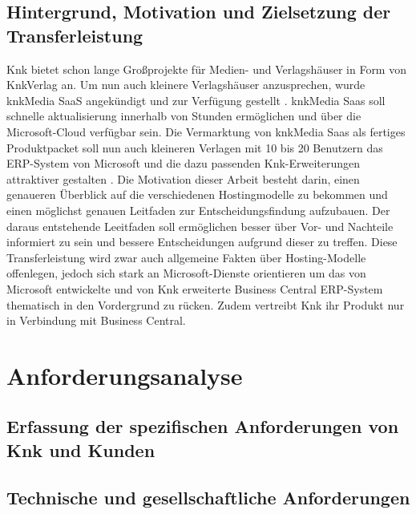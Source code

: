 \documentclass[12pt,bibtotoc]{article}
\begin{document}
	\subsection{Hintergrund, Motivation und Zielsetzung der Transferleistung}
	Knk bietet schon lange Großprojekte für Medien- und Verlagshäuser in Form von KnkVerlag an. 
	Um nun auch kleinere Verlagshäuser anzusprechen, wurde knkMedia SaaS angekündigt und zur Verfügung gestellt \cite{knk-kuendigtSaaS-an.2023}.
	\newline
	knkMedia Saas soll schnelle aktualisierung innerhalb von Stunden ermöglichen und über die Microsoft-Cloud verfügbar sein.
	Die Vermarktung von knkMedia Saas als fertiges Produktpacket soll nun auch kleineren Verlagen mit 10 bis 20 Benutzern das ERP-System von Microsoft und die dazu passenden Knk-Erweiterungen attraktiver gestalten \cite{knk-kuendigtSaaS-an.2023}.
	\newline
	Die Motivation dieser Arbeit besteht darin, einen genaueren Überblick auf die verschiedenen Hostingmodelle zu bekommen und einen möglichst genauen Leitfaden zur Entscheidungsfindung aufzubauen.
	Der daraus entstehende Leeitfaden soll ermöglichen besser über Vor- und Nachteile informiert zu sein und bessere Entscheidungen aufgrund dieser zu treffen. 
	\newline
	Diese Transferleistung wird zwar auch allgemeine Fakten über Hosting-Modelle offenlegen, jedoch sich stark an Microsoft-Dienste orientieren um das von Microsoft entwickelte und von Knk erweiterte Business Central ERP-System 
	thematisch in den Vordergrund zu rücken. Zudem vertreibt Knk ihr Produkt nur in Verbindung mit Business Central.


	\section{Anforderungsanalyse}
	\subsection{Erfassung der spezifischen Anforderungen von Knk und Kunden}
	\subsection{Technische und gesellschaftliche Anforderungen}
\end{document}
